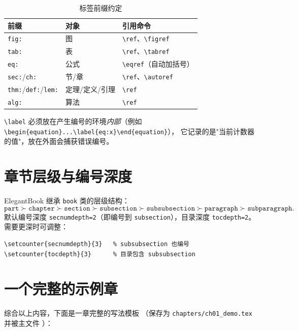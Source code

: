 \begin{table}[htbp]
  \centering
  \caption{标签前缀约定}\label{tab:labels}
  \begin{tabular}{lll}
    \toprule
    前缀 & 对象 & 引用命令 \\
    \midrule
    \texttt{fig:} & 图 & \verb|\ref|、\verb|\figref| \\
    \texttt{tab:} & 表 & \verb|\ref|、\verb|\tabref| \\
    \texttt{eq:} & 公式 & \verb|\eqref|（自动加括号）\\
    \texttt{sec:}/\texttt{ch:} & 节/章 & \verb|\ref|、\verb|\autoref| \\
    \texttt{thm:}/\texttt{def:}/\texttt{lem:} & 定理/定义/引理 & \verb|\ref| \\
    \texttt{alg:} & 算法 & \verb|\ref| \\
    \bottomrule
  \end{tabular}
\end{table}

\verb|\label| 必须放在产生编号的环境\emph{内部}（例如
\verb|\begin{equation}...\label{eq:x}\end{equation}|），
它记录的是"当前计数器的值"，放在外面会捕获错误编号。

\section{章节层级与编号深度}

ElegantBook 继承 \texttt{book} 类的层级结构：
\begin{equation*}
  \texttt{part} \succ \texttt{chapter} \succ \texttt{section}
  \succ \texttt{subsection} \succ \texttt{subsubsection}
  \succ \texttt{paragraph} \succ \texttt{subparagraph}.
\end{equation*}
默认编号深度 \texttt{secnumdepth=2}（即编号到
\texttt{subsection}），目录深度 \texttt{tocdepth=2}。
需要更深时可调整：
\begin{lstlisting}
\setcounter{secnumdepth}{3}   % subsubsection 也编号
\setcounter{tocdepth}{3}      % 目录包含 subsubsection
\end{lstlisting}

\section{一个完整的示例章}

综合以上内容，下面是一章完整的写法模板
（保存为 \texttt{chapters/ch01\_demo.tex} 并被主文件
\verb||）：

